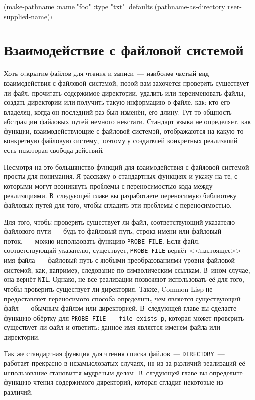\begin{myverb}
(make-pathname 
  :name "foo" :type "txt" :defaults (pathname-as-directory user-supplied-name))
\end{myverb}

\section{Взаимодействие с файловой системой}

Хоть открытие файлов для чтения и записи~--- наиболее частый вид взаимодействия с файловой
системой, порой вам захочется проверить существует ли файл, прочитать содержимое
директории, удалить или переименовать файлы, создать директории или получить такую
информацию о файле, как: кто его владелец, когда он последний раз был изменён, его
длину. Тут-то общность абстракции файловых путей немного некстати. Стандарт языка не
определяет, как функции, взаимодействующие с файловой системой, отображаются на какую-то
конкретную файловую систему, поэтому у создателей конкретных реализаций есть некоторая
свобода действий.

Несмотря на это большинство функций для взаимодействия с файловой системой просты для
понимания. Я расскажу о стандартных функциях и укажу на те, с которыми могут возникнуть
проблемы с переносимостью кода между реализациями. В~следующей главе вы разработаете
переносимую библиотеку файловых путей для того, чтобы сгладить эти проблемы с
переносимостью.

Для того, чтобы проверить существует ли файл, соответствующий указателю файлового пути~---
будь-то файловый путь, строка имени или файловый поток,~--- можно использовать функцию
\lstinline{PROBE-FILE}. Если файл, соответствующий указателю, существует, \lstinline{PROBE-FILE}
вернёт <<настоящее>> имя файла~--- файловый путь с любыми преобразованиями уровня файловой
системой, как, например, следование по символическим ссылкам. В~ином случае, она вернёт
\lstinline{NIL}. Однако, не все реализации позволяют использовать её для того, чтобы проверить
существует ли директория. Также, Common Lisp не предоставляет переносимого способа
определить, чем является существующий файл~--- обычным файлом или директорией. В~следующей
главе вы сделаете функцию-обёртку для \lstinline{PROBE-FILE}~--- \lstinline{file-exists-p}, которая
может проверить существует ли файл и ответить: данное имя является именем файла или
директории.

Так же стандартная функция для чтения списка файлов~--- \lstinline{DIRECTORY}~--- работает
прекрасно в незамысловатых случаях, но из-за различий реализаций её использование
становится мудреным делом. В~следующей главе вы определите функцию чтения содержимого
директорий, которая сгладит некоторые из различий.

